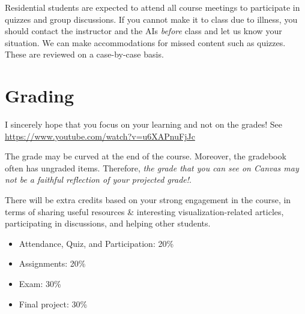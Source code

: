 \documentclass[11pt,article,oneside]{memoir} %
\begin{document}
Residential students are expected to attend all course meetings to participate in quizzes and group discussions. If you cannot make it to class due to illness, you should contact the instructor and the AIs \emph{before} class and let us know your situation. We can make accommodations for missed content such as quizzes. These are reviewed on a case-by-case basis.



\section{Grading}\label{sec:grading_tentative_}%

I sincerely hope that you focus on your learning and not on the grades! See \url{https://www.youtube.com/watch?v=u6XAPnuFjJc} 

The grade may be curved at the end of the course. Moreover, the gradebook often has ungraded items. Therefore, \emph{the grade that you can see on Canvas may not be a faithful reflection of your projected grade!}. 

There will be extra credits based on your strong engagement in the course, in terms of sharing useful resources \& interesting visualization-related articles, participating in discussions, and helping other students.

\begin{itemize}%

\item Attendance, Quiz, and Participation: 20\%

\item Assignments: 20\% 

\item Exam: 30\%

\item Final project: 30\%

\end{itemize}%
\end{document}

